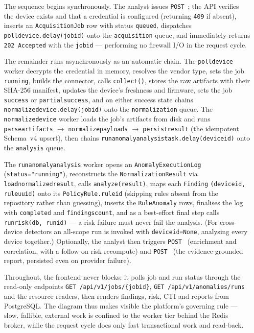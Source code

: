 \documentclass[12pt,a4paper]{report}
\renewcommand{\_}{\textunderscore\allowbreak}
\begin{document}
The sequence begins synchronously. The analyst issues \texttt{POST}~; the API verifies the device exists and that a credential is configured (returning \texttt{409} if absent), inserts an \texttt{AcquisitionJob} row with status \texttt{queued}, dispatches \texttt{poll\_device.delay(job\_id)} onto the \texttt{acquisition} queue, and immediately returns \texttt{202 Accepted} with the \texttt{job\_id} --- performing no firewall I/O in the request cycle.

The remainder runs asynchronously as an automatic chain. The \texttt{poll\_device} worker decrypts the credential in memory, resolves the vendor type, sets the job \texttt{running}, builds the connector, calls \texttt{collect()}, stores the raw artifacts with their SHA-256 manifest, updates the device's freshness and firmware, sets the job \texttt{success} or \texttt{partial\_success}, and on either success state chains \texttt{normalize\_device.delay(job\_id)} onto the \texttt{normalization} queue. The \texttt{normalize\_device} worker loads the job's artifacts from disk and runs \texttt{parse\_artifacts} $\rightarrow$ \texttt{normalize\_payloads} $\rightarrow$ \texttt{persist\_result} (the idempotent Schema~v4 upsert), then chains \texttt{run\_anomaly\_analysis\_task.delay(device\_id)} onto the \texttt{analysis} queue.

The \texttt{run\_anomaly\_analysis} worker opens an \texttt{AnomalyExecutionLog} (\texttt{status="running"}), reconstructs the \texttt{NormalizationResult} via \texttt{load\_normalized\_result}, calls \texttt{analyze(result)}, maps each \texttt{Finding} \texttt{(device\_id, rule\_uuid)} onto its \texttt{PolicyRule.rule\_id} (skipping rules absent from the repository rather than guessing), inserts the \texttt{RuleAnomaly} rows, finalises the log with \texttt{completed} and \texttt{findings\_count}, and as a best-effort final step calls \texttt{run\_risk(db, run\_id)} --- a risk failure must never fail the analysis. (For cross-device detectors an all-scope run is invoked with \texttt{device\_id=None}, analysing every device together.) Optionally, the analyst then triggers \texttt{POST}~ (enrichment and correlation, with a follow-on risk recompute) and \texttt{POST}~ (the evidence-grounded report, persisted even on provider failure).

Throughout, the frontend never blocks: it polls job and run status through the read-only endpoints \texttt{GET /api/v1/jobs/\{job\_id\}}, \texttt{GET /api/v1/anomalies/runs} and the resource readers, then renders findings, risk, CTI and reports from PostgreSQL. The diagram thus makes visible the platform's governing rule --- slow, fallible, external work is confined to the worker tier behind the Redis broker, while the request cycle does only fast transactional work and read-back.
\end{document}
